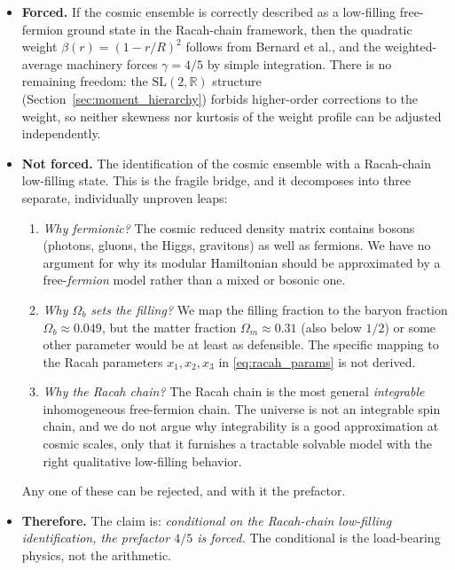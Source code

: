 \documentclass[11pt,letterpaper]{article}
\begin{document}
\begin{itemize}
  \item \textbf{Forced.} If the cosmic ensemble is correctly
    described as a low-filling free-fermion ground state in the
    Racah-chain framework, then the quadratic weight
    $\beta(r) = (1-r/R)^2$ follows from Bernard et al., and the
    weighted-average machinery forces $\gamma = 4/5$ by simple
    integration. There is no remaining freedom: the
    $\mathrm{SL}(2,\mathbb{R})$ structure
    (Section~\ref{sec:moment_hierarchy}) forbids higher-order
    corrections to the weight, so neither skewness nor kurtosis of
    the weight profile can be adjusted independently.
  \item \textbf{Not forced.} The identification of the cosmic
    ensemble with a Racah-chain low-filling state. This is the
    fragile bridge, and it decomposes into three separate, individually
    unproven leaps:
    \begin{enumerate}
      \item \emph{Why fermionic?} The cosmic reduced density matrix
        contains bosons (photons, gluons, the Higgs, gravitons) as
        well as fermions. We have no argument for why its modular
        Hamiltonian should be approximated by a free-\emph{fermion}
        model rather than a mixed or bosonic one.
      \item \emph{Why $\Omega_b$ sets the filling?} We map the filling
        fraction to the baryon fraction $\Omega_b \approx 0.049$, but
        the matter fraction $\Omega_m \approx 0.31$ (also below $1/2$)
        or some other parameter would be at least as defensible. The
        specific mapping to the Racah parameters $x_1, x_2, x_3$ in
        \cref{eq:racah_params} is not derived.
      \item \emph{Why the Racah chain?} The Racah chain is the most
        general \emph{integrable} inhomogeneous free-fermion chain.
        The universe is not an integrable spin chain, and we do not
        argue why integrability is a good approximation at cosmic
        scales, only that it furnishes a tractable solvable model with
        the right qualitative low-filling behavior.
    \end{enumerate}
    Any one of these can be rejected, and with it the prefactor.
  \item \textbf{Therefore.} The claim is: \emph{conditional on the
    Racah-chain low-filling identification, the prefactor $4/5$ is
    forced.} The conditional is the load-bearing physics, not the
    arithmetic.
\end{itemize}
\end{document}

